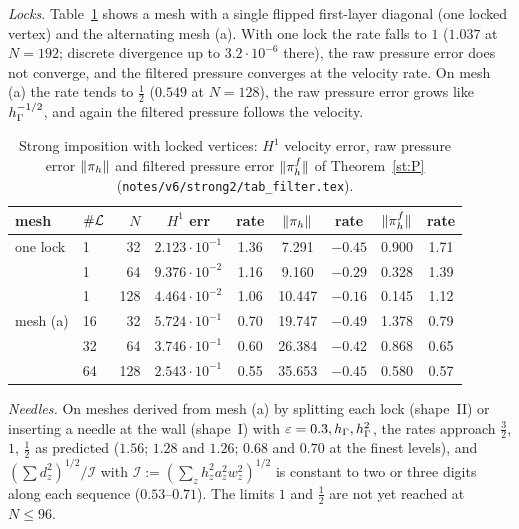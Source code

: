 \emph{Locks.} Table~\ref{st:tab:lock} shows a mesh with a single flipped first-layer diagonal (one locked vertex) and the alternating mesh (a). With one lock the rate falls to $1$ ($1.037$ at $N=192$; discrete divergence up to $3.2\cdot10^{-6}$ there), the raw pressure error does not converge, and the filtered pressure converges at the velocity rate. On mesh (a) the rate tends to $\frac12$ ($0.549$ at $N=128$), the raw pressure error grows like $h_\Gamma^{-1/2}$, and again the filtered pressure follows the velocity.

\begin{table}[t]
\centering\small
\caption{Strong imposition with locked vertices: $H^1$ velocity error, raw pressure error $\lVert \pi_h\rVert$ and filtered pressure error $\lVert \pi_h^f\rVert$ of Theorem~\ref{st:P} (\texttt{notes/v6/strong2/tab\_filter.tex}).}\label{st:tab:lock}
\begin{tabular}{llrcccccc}
\toprule
mesh & $\#\mathcal L$ & $N$ & $H^1$ err & rate & $\lVert \pi_h\rVert$ & rate & $\lVert \pi_h^f\rVert$ & rate\\
\midrule
one lock & 1 & 32 & $2.123\cdot10^{-1}$ & 1.36 & 7.291 & $-0.45$ & 0.900 & 1.71\\
 & 1 & 64 & $9.376\cdot10^{-2}$ & 1.16 & 9.160 & $-0.29$ & 0.328 & 1.39\\
 & 1 & 128 & $4.464\cdot10^{-2}$ & 1.06 & 10.447 & $-0.16$ & 0.145 & 1.12\\
mesh (a) & 16 & 32 & $5.724\cdot10^{-1}$ & 0.70 & 19.747 & $-0.49$ & 1.378 & 0.79\\
 & 32 & 64 & $3.746\cdot10^{-1}$ & 0.60 & 26.384 & $-0.42$ & 0.868 & 0.65\\
 & 64 & 128 & $2.543\cdot10^{-1}$ & 0.55 & 35.653 & $-0.45$ & 0.580 & 0.57\\
\bottomrule
\end{tabular}
\end{table}

\emph{Needles.} On meshes derived from mesh (a) by splitting each lock (shape~II) or inserting a needle at the wall (shape~I) with $\varepsilon=0.3,h_\Gamma,h_\Gamma^2$, the rates approach $\frac32$, $1$, $\frac12$ as predicted ($1.56$; $1.28$ and $1.26$; $0.68$ and $0.70$ at the finest levels), and $(\sum d_z^2)^{1/2}/\mathcal I$ with $\mathcal I:=(\sum_zh_z^2a_z^2w_z^2)^{1/2}$ is constant to two or three digits along each sequence ($0.53$--$0.71$). The limits $1$ and $\frac12$ are not yet reached at $N\le96$.

